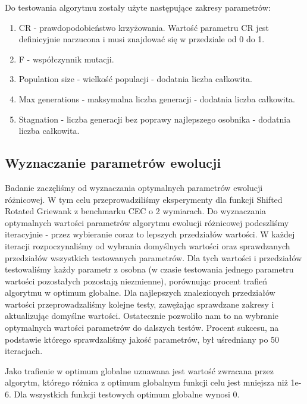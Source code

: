 \documentclass{article}
\begin{document}
Do testowania algorytmu zostały użyte następujące zakresy parametrów:

\begin{enumerate}
    \item CR - prawdopodobieństwo krzyżowania. Wartość parametru CR jest definicyjnie narzucona i musi znajdować się w przedziale od 0 do 1.
    \item F - współczynnik mutacji.
    \item Population size - wielkość populacji - dodatnia liczba całkowita.
    \item Max generations - maksymalna liczba generacji - dodatnia liczba całkowita.
    \item Stagnation - liczba generacji bez poprawy najlepszego osobnika - dodatnia liczba całkowita.
\end{enumerate}

\subsection{Wyznaczanie parametrów ewolucji}

Badanie zaczęliśmy od wyznaczania optymalnych parametrów ewolucji różnicowej. W tym celu przeprowadziliśmy eksperymenty dla funkcji Shifted Rotated Griewank z benchmarku CEC o 2 wymiarach. Do wyznaczania optymalnych wartości parametrów algorytmu ewolucji różnicowej podeszliśmy iteracyjnie - przez wybieranie coraz to lepszych przedziałów wartości. W każdej iteracji rozpoczynaliśmy od wybrania domyślnych wartości oraz sprawdzanych przedziałów wszystkich testowanych parametrów. Dla tych wartości i przedziałów testowaliśmy każdy parametr z osobna (w czasie testowania jednego parametru wartości pozostałych pozostają niezmienne), porównując procent trafień algorytmu w optimum globalne. Dla najlepszych znalezionych przedziałów wartości przeprowadzaliśmy kolejne testy, zawężając sprawdzane zakresy i aktualizując domyślne wartości. Ostatecznie pozwoliło nam to na wybranie optymalnych wartości parametrów do dalszych testów. Procent sukcesu, na podstawie którego sprawdzaliśmy jakość parametrów, był uśredniany po 50 iteracjach. 

Jako trafienie w optimum globalne uznawana jest wartość zwracana przez algorytm, którego różnica z optimum globalnym funkcji celu jest mniejsza niż 1e-6. Dla wszystkich funkcji testowych optimum globalne wynosi 0.
\end{document}

